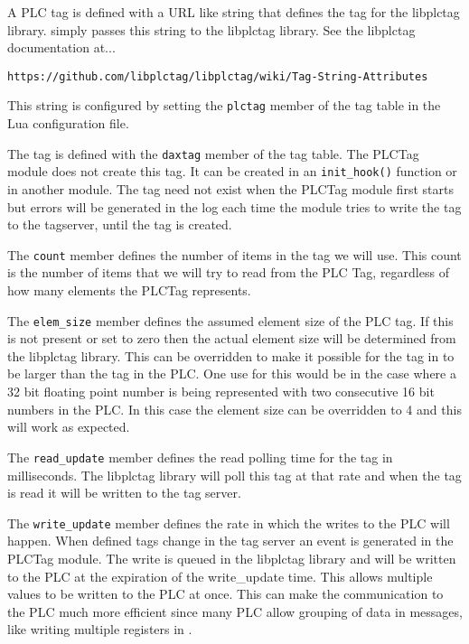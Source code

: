 A PLC tag is defined with a URL like string that defines the tag
for the libplctag library.  \opendax  simply passes this string to
the libplctag library.  See the libplctag documentation at...

\texttt{https://github.com/libplctag/libplctag/wiki/Tag-String-Attributes}

This string is configured by setting the \texttt{plctag}
member of the tag table in the Lua configuration file.

The \opendax tag is defined with the \texttt{daxtag} member of the
tag table.  The PLCTag module does not create this tag.  It can
be created in an \texttt{init\_hook()} function or in another module.
The tag need not exist when the PLCTag module first starts but errors
will be generated in the log each time the module tries to write the
tag to the tagserver, until the tag is created.

The \texttt{count} member defines the number of items in the \opendax
tag we will use.  This count is the number of items that we will try
to read from the PLC Tag, regardless of how many elements the PLCTag
represents.

The \texttt{elem\_size} member defines the assumed element size of
the PLC tag.  If this is not present or set to zero then the actual
element size will be determined from the libplctag library.  This 
can be overridden to make it possible for the tag in \opendax{} to be
larger than the tag in the PLC.  One use for this would be in the case
where a 32 bit floating point number is being represented with two
consecutive 16 bit numbers in the PLC.  In this case the element size
can be overridden to 4 and this will work as expected.

The \texttt{read\_update} member defines the read polling time
for the tag in milliseconds.  The libplctag library will poll this
tag at that rate and when the tag is read it will be written to the
\opendax{} tag server.

The \texttt{write\_update} member defines the rate in which the writes
to the PLC will happen.  When defined tags change in the tag server an
event is generated in the PLCTag module.  The write is queued in the
libplctag library and will be written to the PLC at the expiration of
the write\_update time.  This allows multiple values to be written to
the PLC at once.  This can make the communication to the PLC much more
efficient since many PLC allow grouping of data in messages, like writing
multiple registers in \modbus{}.


